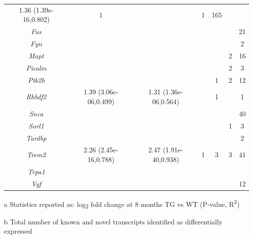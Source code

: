 \begin{table}[]
\begin{threeparttable}
\begin{tabular}{@{}ccccccc@{}}
		1.36 (1.39e-16,0.802) &
		1 &
		\cellcolor[HTML]{EFEFEF} &
		1 &
		165 \\
		\textit{Fus} &
		\cellcolor[HTML]{EFEFEF} &
		\cellcolor[HTML]{EFEFEF} &
		\cellcolor[HTML]{EFEFEF} &
		\cellcolor[HTML]{EFEFEF} &
		\cellcolor[HTML]{EFEFEF} &
		21 \\
		\textit{Fyn} &
		\cellcolor[HTML]{EFEFEF} &
		\cellcolor[HTML]{EFEFEF} &
		\cellcolor[HTML]{EFEFEF} &
		\cellcolor[HTML]{EFEFEF} &
		\cellcolor[HTML]{EFEFEF} &
		2 \\
		\textit{Mapt} &
		\cellcolor[HTML]{EFEFEF} &
		\cellcolor[HTML]{EFEFEF} &
		\cellcolor[HTML]{EFEFEF} &
		\cellcolor[HTML]{EFEFEF} &
		2 &
		16 \\
		\textit{Picalm} &
		\cellcolor[HTML]{EFEFEF} &
		\cellcolor[HTML]{EFEFEF} &
		\cellcolor[HTML]{EFEFEF} &
		\cellcolor[HTML]{EFEFEF} &
		2 &
		3 \\
		\textit{Ptk2b} &
		\cellcolor[HTML]{EFEFEF} &
		\cellcolor[HTML]{EFEFEF} &
		\cellcolor[HTML]{EFEFEF} &
		1 &
		2 &
		12 \\
		\textit{Rhbdf2} &
		1.39 (3.06e-06,0.499) &
		1.31 (1.36e-06,0.564) &
		\cellcolor[HTML]{EFEFEF} &
		1 &
		\cellcolor[HTML]{EFEFEF} &
		1 \\
		\textit{Snca} &
		\cellcolor[HTML]{EFEFEF} &
		\cellcolor[HTML]{EFEFEF} &
		\cellcolor[HTML]{EFEFEF} &
		\cellcolor[HTML]{EFEFEF} &
		\cellcolor[HTML]{EFEFEF} &
		40 \\
		\textit{Sorl1} &
		\cellcolor[HTML]{EFEFEF} &
		\cellcolor[HTML]{EFEFEF} &
		\cellcolor[HTML]{EFEFEF} &
		\cellcolor[HTML]{EFEFEF} &
		1 &
		3 \\
		\textit{Tardbp} &
		\cellcolor[HTML]{EFEFEF} &
		\cellcolor[HTML]{EFEFEF} &
		\cellcolor[HTML]{EFEFEF} &
		\cellcolor[HTML]{EFEFEF} &
		\cellcolor[HTML]{EFEFEF} &
		2 \\
		\textit{Trem2} &
		2.26 (2.45e-16,0.788) &
		2.47 (1.91e-40,0.938) &
		1 &
		3 &
		3 &
		41 \\
		\textit{Trpa1} &
		\cellcolor[HTML]{EFEFEF} &
		\cellcolor[HTML]{EFEFEF} &
		\cellcolor[HTML]{EFEFEF} &
		\cellcolor[HTML]{EFEFEF} &
		\cellcolor[HTML]{EFEFEF} &
		\cellcolor[HTML]{EFEFEF} \\
		\textit{Vgf} &
		\cellcolor[HTML]{EFEFEF} &
		\cellcolor[HTML]{EFEFEF} &
		\cellcolor[HTML]{EFEFEF} &
		\cellcolor[HTML]{EFEFEF} &
		\cellcolor[HTML]{EFEFEF} &
		12 \\ \bottomrule
	\end{tabular}
	\begin{tablenotes}
	\footnotesize
	\item[a] Statistics reported as: log\textsubscript{2} fold change at 8 months TG vs WT (P-value, R\textsuperscript{2})
	\item[b] Total number of known and novel transcripts identified as differentially expressed 
\end{tablenotes}
	\end{threeparttable}
\end{table}


